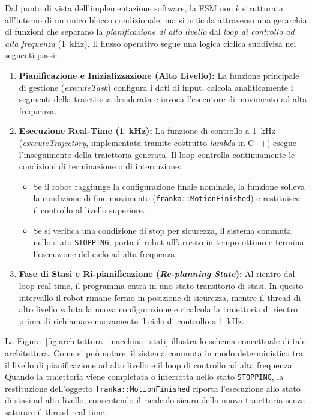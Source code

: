 Dal punto di vista dell'implementazione software, la FSM non è strutturata all'interno di un unico blocco condizionale, ma si articola attraverso una gerarchia di funzioni che separano la \textit{pianificazione di alto livello} dal \textit{loop di controllo ad alta frequenza} (\SI{1}{\kHz}). Il flusso operativo segue una logica ciclica suddivisa nei seguenti passi:

\begin{enumerate}
	\item \textbf{Pianificazione e Inizializzazione (Alto Livello):} La funzione principale di gestione (\textit{executeTask}) configura i dati di input, calcola analiticamente i segmenti della traiettoria desiderata e invoca l'esecutore di movimento ad alta frequenza.
	\item \textbf{Esecuzione Real-Time (\SI{1}{\kHz}):} La funzione di controllo a \SI{1}{\kHz} (\textit{executeTrajectory}, implementata tramite costrutto \textit{lambda} in C++) esegue l'inseguimento della traiettoria generata. Il loop controlla continuamente le condizioni di terminazione o di interruzione:
	\begin{itemize}
		\item Se il robot raggiunge la configurazione finale nominale, la funzione solleva la condizione di fine movimento (\texttt{franka::MotionFinished}) e restituisce il controllo al livello superiore.
		\item Se si verifica una condizione di stop per sicurezza, il sistema commuta nello stato \texttt{STOPPING}, porta il robot all'arresto in tempo ottimo e termina l'esecuzione del ciclo ad alta frequenza.
	\end{itemize}
	\item \textbf{Fase di Stasi e Ri-pianificazione (\textit{Re-planning State}):} Al rientro dal loop real-time, il programma entra in uno stato transitorio di stasi. In questo intervallo il robot rimane fermo in posizione di sicurezza, mentre il thread di alto livello valuta la nuova configurazione e ricalcola la traiettoria di rientro prima di richiamare nuovamente il ciclo di controllo a \SI{1}{\kHz}.
\end{enumerate}

La Figura~\ref{fig:architettura_macchina_stati} illustra lo schema concettuale di tale architettura. Come si può notare, il sistema commuta in modo deterministico tra il livello di pianificazione ad alto livello e il loop di controllo ad alta frequenza. Quando la traiettoria viene completata o interrotta nello stato \texttt{STOPPING}, la restituzione dell'oggetto \texttt{franka::MotionFinished} riporta l'esecuzione allo stato di stasi ad alto livello, consentendo il ricalcolo sicuro della nuova traiettoria senza saturare il thread real-time.

